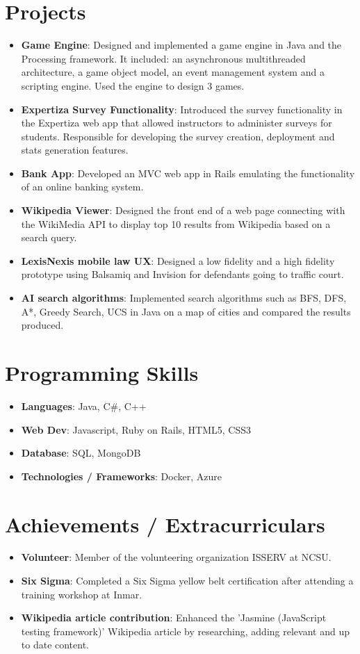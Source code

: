 \documentclass[letterpaper,11pt]{article}
\newcommand{\resumeItem}[2]{
  \item\small{
    \textbf{#1}{: #2 \vspace{-2pt}}
  }
}
\newcommand{\resumeSubItem}[2]{\resumeItem{#1}{#2}\vspace{-4pt}}
\newcommand{\resumeSubHeadingListStart}{\begin{itemize}[leftmargin=*]}
\newcommand{\resumeSubHeadingListEnd}{\end{itemize}}
\begin{document}

\section{Projects}
  \resumeSubHeadingListStart
    \resumeSubItem{Game Engine}
      {Designed and implemented a game engine in Java and the Processing framework. It included: an asynchronous multithreaded architecture, a game object model, an event management system and a scripting engine. Used the engine to design 3 games.}
    \resumeSubItem{Expertiza Survey Functionality}
      {Introduced the survey functionality in the Expertiza web app that allowed instructors to administer surveys for students. Responsible for developing the survey creation, deployment and stats generation features.}
    \resumeSubItem{Bank App}
      {Developed an MVC web app in Rails emulating the functionality of an online banking system.}
    \resumeSubItem{Wikipedia Viewer}
      {Designed the front end of a web page connecting with the WikiMedia API to display top 10 results from Wikipedia based on a search query.}
    \resumeSubItem{LexisNexis mobile law UX}
      {Designed a low fidelity and a high fidelity prototype using Balsamiq and Invision for defendants going to traffic court.}
      \resumeSubItem{AI search algorithms}
      {Implemented search algorithms such as BFS, DFS, A*, Greedy Search, UCS in Java on a map of cities and compared the results produced.}
  \resumeSubHeadingListEnd


\section{Programming Skills}
  \resumeSubHeadingListStart
    \resumeSubItem{Languages}{Java, C\#, C++}
    \resumeSubItem{Web Dev}{Javascript, Ruby on Rails, HTML5, CSS3}
    \resumeSubItem{Database}{SQL, MongoDB}    
    \resumeSubItem{Technologies / Frameworks}{Docker, Azure}
  \resumeSubHeadingListEnd


\section{Achievements / Extracurriculars}
  \resumeSubHeadingListStart
    \resumeSubItem{Volunteer}
      {Member of the volunteering organization ISSERV at NCSU.}
    \resumeSubItem{Six Sigma}
      {Completed a Six Sigma yellow belt certification after attending a training workshop at Inmar.}
    \resumeSubItem{Wikipedia article contribution}
      {Enhanced the 'Jasmine (JavaScript testing framework)' Wikipedia article by researching, adding relevant and up to date content.}
  \resumeSubHeadingListEnd

\end{document}
